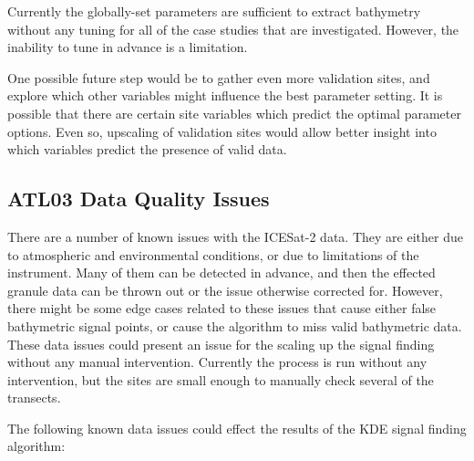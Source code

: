 Currently the globally-set parameters are sufficient to extract bathymetry without any tuning for all of the case studies that are investigated. However, the inability to tune in advance is a limitation. 

One possible future step would be to gather even more validation sites, and explore which other variables might influence the best parameter setting. It is possible that there are certain site variables which predict the optimal parameter options. Even so, upscaling of validation sites would allow better insight into which variables predict the presence of valid data.  

\subsection{ATL03 Data Quality Issues}\label{sec:discussion-photon-issues}

There are a number of known issues with the ICESat-2 data. They are either due to atmospheric and environmental conditions, or due to limitations of the instrument. Many of them can be detected in advance, and then the effected granule data can be thrown out or the issue otherwise corrected for. However, there might be some edge cases related to these issues that cause either false bathymetric signal points, or cause the algorithm to miss valid bathymetric data. These data issues could present an issue for the scaling up the signal finding without any manual intervention. Currently the process is run without any intervention, but the sites are small enough to manually check several of the transects.

The following known data issues could effect the results of the KDE signal finding algorithm:


